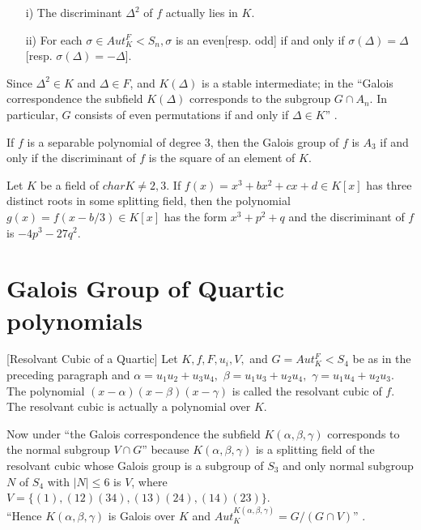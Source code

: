 \begin{theorem}
\begin{enumerate}  \cite{hunger}
\item[i)] The discriminant \({\Delta}^2\) of \(f\) actually lies in \(K\).
  \item[ii)] For each \(\sigma \in Aut_K^F < S_n, \sigma\) is an even[resp. odd] if and only if \(\sigma(\Delta) = \Delta\)[resp. \(\sigma(\Delta) = - \Delta\)].
  \end{enumerate}
\end{theorem}
Since \({\Delta}^2 \in K\) and \(\Delta \in F\), and \(K(\Delta)\) is a stable intermediate; in the ``Galois correspondence the subfield \(K(\Delta)\) corresponds to the subgroup \(G \cap A_n\). In particular, \(G\) consists of even permutations if and only if \(\Delta \in K\)'' \cite{hunger}.

\begin{corollary} \cite{hunger}
  If \(f\) is a separable polynomial of degree \(3\), then the Galois group of \(f\) is \(A_3\) if and only if the discriminant of \(f\) is the square of an element of \(K\).
\end{corollary}
\vspace{-3mm}
\begin{theorem} \cite{hunger}
  Let \(K\) be a field of \(char K \neq 2,3 \). If \(f(x)=x^3+bx^2+cx+d \in K[x]\) has three distinct roots in some splitting field, then the polynomial \(g(x)=f(x-b/3) \in K[x]\) has the form \(x^3+p^2+q\) and the discriminant of \(f\) is \(-4p^3-27q^2\).
\end{theorem}
\vspace{-2mm}
\section{Galois Group of Quartic polynomials}
\begin{definition} \cite{hunger} [Resolvant Cubic of a Quartic]
Let \(K, f, F, u_i, V,\) and \(G=Aut_K^F<S_4\) be as in the preceding paragraph and \(\alpha=u_1u_2+u_3u_4,\) \(\beta=u_1u_3+u_2u_4,\) \(\gamma=u_1u_4+u_2u_3\).
The polynomial \( (x- \alpha)(x- \beta)(x- \gamma) \) is called the resolvant cubic of \(f\). The resolvant cubic is actually a polynomial over \(K\).
\end{definition}

Now under ``the Galois correspondence the subfield \(K(\alpha, \beta, \gamma)\) corresponds to the normal subgroup \(V \cap G\)'' \cite{hunger} because \(K(\alpha,\beta,\gamma)\) is a splitting field of the resolvant cubic whose Galois group is a subgroup of \(S_3\) and only normal subgroup \(N\) of \(S_4\) with \(|N| \leq 6\) is \(V\), where \(V=\{(1),(12)(34),(13)(24),(14)(23)\}\).\\
``Hence \(K(\alpha, \beta, \gamma)\) is Galois over \(K\) and \(Aut_K^{K(\alpha, \beta, \gamma)} = G/(G \cap V)\)'' \cite{hunger}.

